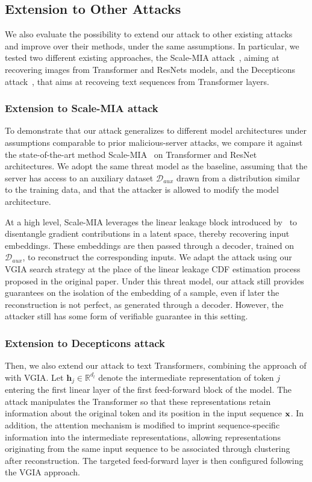 \subsection{Extension to Other Attacks}
We also evaluate the possibility to extend our attack to other existing attacks and improve over their methods, under the same assumptions. In particular, we tested two different existing approaches, the Scale-MIA attack~\cite{shiScaleMIAScalableModel2025}, aiming at recovering images from Transformer and ResNets models, and the Decepticons attack~\cite{fowlDecepticonsCorruptedTransformers2022}, that aims at recoveing text sequences from Transformer layers. 
\subsubsection{Extension to Scale-MIA attack}\label{sec:scalemia_comparison}
To demonstrate that our attack generalizes to different model architectures under assumptions comparable to prior malicious-server attacks, we compare it against the state-of-the-art method Scale-MIA~ on Transformer and ResNet architectures. We adopt the same threat model as the baseline, assuming that the server has access to an auxiliary dataset $\mathcal{D}_{aux}$ drawn from a distribution similar to the training data, and that the attacker is allowed to modify the model architecture.

At a high level, Scale-MIA leverages the linear leakage block introduced by~\cite{fowlRobbingFedDirectly2021} to disentangle gradient contributions in a latent space, thereby recovering input embeddings. These embeddings are then passed through a decoder, trained on $\mathcal{D}_{aux}$, to reconstruct the corresponding inputs.
We adapt the attack using our VGIA search strategy at the place of the linear leakage CDF estimation process proposed in the original paper. Under this threat model, our attack still provides guarantees on the isolation of the embedding of a sample, even if later the reconstruction is not perfect, as generated through a decoder. However, the attacker still has some form of verifiable guarantee in this setting.


\subsubsection{Extension to Decepticons attack}

Then, we also extend our attack to text Transformers, combining the approach of  with VGIA.
 Let $\mathbf{h}_j\in\mathbb{R}^{d_{l}}$ denote the intermediate representation of token $j$ entering the first linear layer of the first feed-forward block of the model. The attack manipulates the Transformer so that these representations retain information about the original token and its position in the input sequence ${\mathbf{x}}$. In addition, the attention mechanism is modified to imprint sequence-specific information into the intermediate representations, allowing representations originating from the same input sequence to be associated through clustering after reconstruction. The targeted feed-forward layer is then configured following the VGIA approach.


